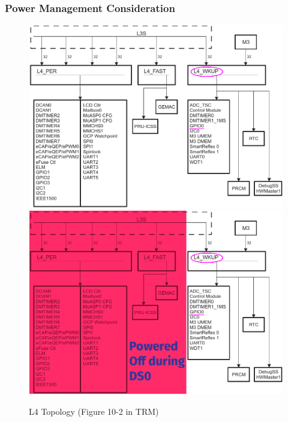 \documentclass[aspectratio=169,usenames,dvipsnames]{beamer}
\begin{document}
\begin{frame}
  \frametitle{Power Management Consideration}
  \begin{overlayarea}{\textwidth}{\textheight}
    \begin{figure}
      \centering
      {%
      \includegraphics[scale=0.3]{images/l4-gpio0-wkup.png}
      }%
      {%
      \includegraphics[scale=0.3]{images/l4-gpio0-wkup-ds0.png}
      }%
      \caption{L4 Topology (Figure 10-2 in TRM)}
    \end{figure}
  \end{overlayarea}
  \vspace*{-10mm}
\end{frame}
\end{document}
